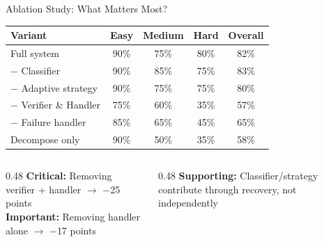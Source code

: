 \documentclass[aspectratio=169]{beamer}
\begin{document}
\begin{frame}{Ablation Study: What Matters Most?}

\centering
\begin{tabular}{lcccc}
\toprule
\textbf{Variant} & \textbf{Easy} & \textbf{Medium} & \textbf{Hard} & \textbf{Overall} \\
\midrule
Full system & 90\% & 75\% & 80\% & 82\% \\
$-$ Classifier & 90\% & 85\% & 75\% & 83\% \\
$-$ Adaptive strategy & 90\% & 75\% & 75\% & 80\% \\
$-$ Verifier \& Handler & 75\% & 60\% & 35\% & 57\% \\
$-$ Failure handler & 85\% & 65\% & 45\% & 65\% \\
Decompose only & 90\% & 50\% & 35\% & 58\% \\
\bottomrule
\end{tabular}

\vspace{0.4cm}
\begin{columns}[T]
\begin{column}{0.48\textwidth}
\textcolor{alertred}{\textbf{Critical:}} Removing verifier + handler $\rightarrow$ $-$25 points \\
\textcolor{warnorange}{\textbf{Important:}} Removing handler alone $\rightarrow$ $-$17 points
\end{column}
\begin{column}{0.48\textwidth}
\textcolor{mainblue}{\textbf{Supporting:}} Classifier/strategy contribute through recovery, not independently
\end{column}
\end{columns}

\end{frame}
\end{document}
